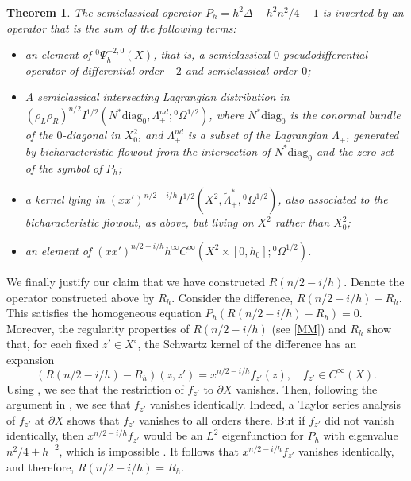 \documentclass[10pt, a4paper, twoside]{amsart}
\numberwithin{equation}{section}
\newtheorem{theorem}{Theorem}
\theoremstyle{remark}
\begin{document}
\begin{theorem}\label{asymptotically hyperbolic resolvent} The semiclassical operator $P_h = h^2 \Delta - h^2 n^2 /4 - 1$ is inverted by an operator that is the sum of the following terms:
\begin{itemize}
\item an element of ${}^0\Psi^{-2, 0}_h(X)$, that is, a semiclassical $0$-pseudodifferential operator of differential order $-2$ and semiclassical order $0$; 
\item A semiclassical intersecting Lagrangian distribution 
in  $(\rho_L \rho_R)^{n/2} I^{1/2}(N^* {\mathrm{diag}_0}, \Lambda_+^{nd}; {{}^0\Omega^{1/2}})$, where $N^* {\mathrm{diag}_0}$ is the conormal bundle of the $0$-diagonal in $X^2_0$, and $\Lambda_+^{nd}$ is a subset of the Lagrangian $\Lambda_+$, generated by bicharacteristic flowout from the intersection of $N^* {\mathrm{diag}_0}$ and the zero set of the symbol of $P_h$; 
\item a kernel lying in $(x x')^{n/2-i/h} I^{1/2}(X^2, {\tilde \Lambda}_+^*, {{}^0\Omega^{1/2}})$, also associated to the bicharacteristic flowout, as above, but living on $X^2$ rather than $X^2_0$;
\item an element of 
$(xx')^{n/2-i/h} h^\infty C^\infty(X^2\times [0, h_0]; {{}^0\Omega^{1/2}})$.
\end{itemize}
 \end{theorem} 

We finally justify our claim that we have constructed $R(n/2 - i/h)$. Denote the operator constructed above by $R_h$. Consider the difference, $R(n/2 - i/h) -  R_h$. This satisfies the homogeneous equation $P_h(R(n/2 - i/h) - R_h) = 0$. Moreover, the regularity properties of $R(n/2 - i/h)$ (see \eqref{MM})  and $R_h$ show that, for each fixed $z' \in X^\circ$, the Schwartz kernel of the difference has an expansion 
$$
(R(n/2 - i/h) - R_h)(z, z') =  x^{n/2 - i/h} f_{z'}(z), \quad f_{z'} \in  C^\infty(X).
$$
Using \cite[Proposition 3.2]{Graham-Zworski}, we see that the restriction of $f_{z'}$ to $\partial X$ vanishes. Then, following the argument in \cite[proof of Proposition 3.4]{Graham-Zworski}, we see that $f_{z'}$ vanishes identically. Indeed, a Taylor series analysis of $f_{z'}$ at $\partial X$ shows that $f_{z'}$ vanishes to all orders there. But if $f_{z'}$ did not vanish identically, then $x^{n/2 - i/h} f_{z'}$ would be an $L^2$ eigenfunction for $P_h$ with eigenvalue $n^2/4 + h^{-2}$, which is impossible \cite{Mazzeo-1991}. It follows that $x^{n/2 - i/h} f_{z'}$ vanishes identically, and therefore, $R(n/2 -i/h) = R_h$. 
\end{document}

